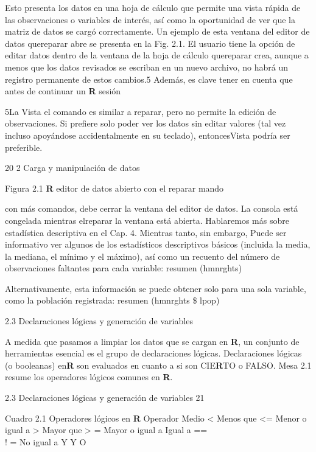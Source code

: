 \documentclass[
]{book}
\begin{document}
Esto presenta los datos en una hoja de cálculo que permite una vista rápida de las observaciones o variables de interés, así como la oportunidad de ver que la matriz de datos se cargó correctamente. Un ejemplo de esta ventana del editor de datos quereparar abre se presenta en la Fig. 2.1. El usuario tiene la opción de editar datos dentro de la ventana de la hoja de cálculo quereparar crea, aunque a menos que los datos revisados se escriban en un nuevo archivo, no habrá un registro permanente de estos cambios.5 Además, es clave tener en cuenta que antes de continuar un \textbf{R} sesión

5La Vista el comando es similar a reparar, pero no permite la edición de observaciones. Si prefiere solo poder ver los datos sin editar valores (tal vez incluso apoyándose accidentalmente en su teclado), entoncesVista podría ser preferible.

20 2 Carga y manipulación de datos

Figura 2.1 \textbf{R} editor de datos abierto con el reparar mando

con más comandos, debe cerrar la ventana del editor de datos. La consola está congelada mientras elreparar la ventana está abierta.
Hablaremos más sobre estadística descriptiva en el Cap. 4. Mientras tanto, sin embargo,
Puede ser informativo ver algunos de los estadísticos descriptivos básicos (incluida la media, la mediana, el mínimo y el máximo), así como un recuento del número de observaciones faltantes para cada variable:
resumen (hmnrghts)

Alternativamente, esta información se puede obtener solo para una sola variable, como la población registrada:
resumen (hmnrghts \$ lpop)

2.3 Declaraciones lógicas y generación de variables

A medida que pasamos a limpiar los datos que se cargan en \textbf{R}, un conjunto de herramientas esencial es el grupo de declaraciones lógicas. Declaraciones lógicas (o booleanas) en\textbf{R} son evaluados en cuanto a si son CIE\textbf{R}TO o FALSO. Mesa 2.1 resume los operadores lógicos comunes en \textbf{R}.

2.3 Declaraciones lógicas y generación de variables 21

Cuadro 2.1 Operadores lógicos en \textbf{R}
Operador Medio
\textless{} Menos que
\textless= Menor o igual a
\textgreater{} Mayor que
\textgreater{} = Mayor o igual a Igual a
==\\
! = No igual a
Y Y
\textbar{} O
\end{document}
